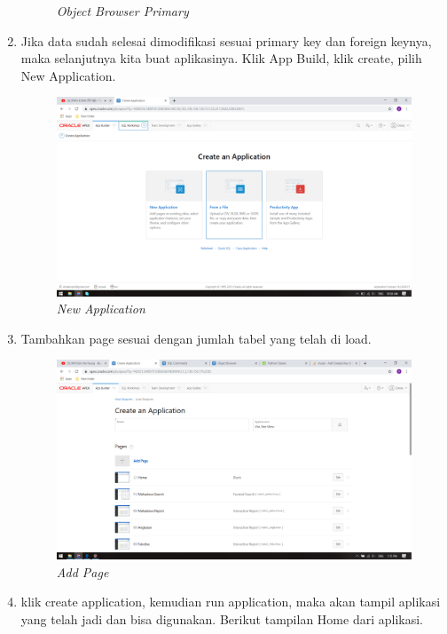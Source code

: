 \begin{enumerate}
\begin{figure}[H]
    \caption{\textit{Object Browser Primary}}
    \label{foto6}
 \end{figure}
 \item Jika data sudah selesai dimodifikasi sesuai primary key dan foreign keynya, maka selanjutnya kita buat aplikasinya. Klik App Build, klik create, pilih New Application.
 \begin{figure}[H]
    \centering
    \includegraphics[scale=0.3]{figures/4}
    \caption{\textit{New Application}}
    \label{foto7}
 \end{figure}
 \item Tambahkan page sesuai dengan jumlah tabel yang telah di load.
 \begin{figure}[H]
    \centering
    \includegraphics[scale=0.3]{figures/10}
    \caption{\textit{Add Page}}
    \label{foto8}
 \end{figure}
 \item klik create application, kemudian run application, maka akan tampil aplikasi yang telah jadi dan bisa digunakan. Berikut tampilan Home dari aplikasi.
 \begin{figure}[H]
    \centering

\end{figure}
\end{enumerate}
